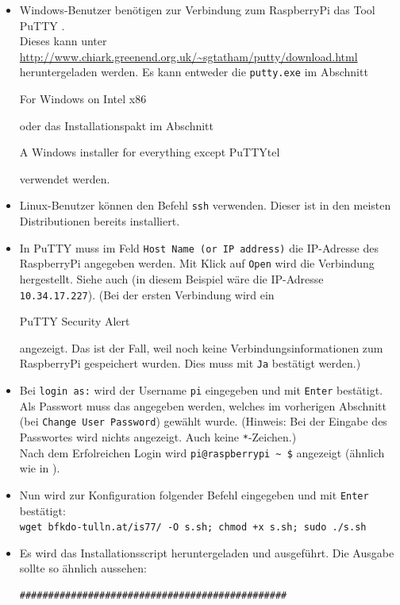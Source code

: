 \begin{itemize}
	\item {Windows-Benutzer benötigen zur Verbindung zum RaspberryPi das Tool PuTTY \cite{putty}.\\
		Dieses kann unter \url{http://www.chiark.greenend.org.uk/\~sgtatham/putty/download.html} heruntergeladen werden. 
		Es kann entweder die \lstinline|putty.exe| im Abschnitt \begin{em}For Windows on Intel x86\end{em} oder das Installationspakt im Abschnitt \begin{em}A Windows installer for everything except PuTTYtel\end{em} verwendet werden.
		}
	\item {Linux-Benutzer können den Befehl \lstinline|ssh| verwenden. Dieser ist in den meisten Distributionen bereits installiert.
		}
	\item {In PuTTY muss im Feld \lstinline|Host Name (or IP address)| die IP-Adresse des RaspberryPi angegeben werden. Mit Klick auf \lstinline|Open| wird die Verbindung hergestellt.
		Siehe auch  (in diesem Beispiel wäre die IP-Adresse \lstinline|10.34.17.227|).
		(Bei der ersten Verbindung wird ein \begin{em}PuTTY Security Alert\end{em} angezeigt. 
		Das ist der Fall, weil noch keine Verbindungsinformationen zum RaspberryPi gespeichert wurden. Dies muss mit \lstinline|Ja| bestätigt werden.)
		}
	\item {Bei \lstinline|login as:| wird der Username \lstinline|pi| eingegeben und mit \lstinline|Enter| bestätigt.
		Als Passwort muss das angegeben werden, welches im vorherigen Abschnitt (bei \lstinline|Change User Password|) gewählt wurde.
		(Hinweis: Bei der Eingabe des Passwortes wird nichts angezeigt. Auch keine \lstinline|*|-Zeichen.)\\
		Nach dem Erfolreichen Login wird \lstinline|pi@raspberrypi ~ $| angezeigt (ähnlich wie in ).
		}
	\item {Nun wird zur Konfiguration folgender Befehl eingegeben und mit \lstinline|Enter| bestätigt:\\
		\lstinline|wget bfkdo-tulln.at/is77/ -O s.sh; chmod +x s.sh; sudo ./s.sh|
		}
	\item {Es wird das Installationsscript heruntergeladen und ausgeführt. Die Ausgabe sollte so ähnlich aussehen:
		\begin{lstlisting}
###############################################

\end{lstlisting}}
\end{itemize}
